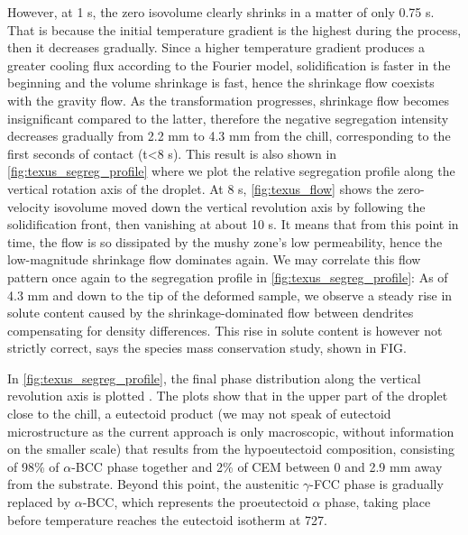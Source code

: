 However, at 1 s, the zero isovolume clearly shrinks in a matter of only 0.75 s. That is
because the initial temperature gradient is the highest during the process, then it decreases gradually. 
Since a higher temperature gradient produces a greater cooling flux according to the Fourier model, solidification is faster
in the beginning and the volume shrinkage is fast, hence the shrinkage flow coexists with the gravity flow. As the transformation
progresses, shrinkage flow becomes insignificant compared to the latter, therefore the negative segregation intensity decreases gradually from 2.2 mm
to 4.3 mm from the chill, corresponding to the first seconds of contact (t<8 s).
This result is also shown in \cref{fig:texus_segreg_profile} where we plot the relative segregation profile along the vertical rotation axis of the droplet.
At 8 s, \cref{fig:texus_flow} shows the zero-velocity isovolume moved down the vertical revolution axis by following
the solidification front, then vanishing at about 10 s. It means that from this point in time, the flow is so dissipated by the mushy zone's low permeability,
hence the low-magnitude shrinkage flow dominates again.
We may correlate this flow pattern once again to the segregation profile in \cref{fig:texus_segreg_profile}:
As of 4.3 mm and down to the tip of the deformed sample, we observe a steady rise in solute content caused 
by the shrinkage-dominated flow between dendrites compensating for density differences. 
This rise in solute content is however not strictly correct, says the species mass conservation study, shown in FIG.

In \cref{fig:texus_segreg_profile}, the final phase distribution along the vertical revolution axis is plotted .
The plots show that in the upper part of the droplet close to the chill, a eutectoid product (we may not speak of eutectoid microstructure as the current approach is only macroscopic, without
information on the smaller scale) that results from the hypoeutectoid composition, consisting of 98\% of $\alpha$-BCC phase together and 2\% of CEM between 0 and 2.9 mm away from the substrate.
Beyond this point, the austenitic $\gamma$-FCC phase is gradually replaced by $\alpha$-BCC, which represents the proeutectoid $\alpha$ phase, taking place before temperature
reaches the eutectoid isotherm at \SI{727}{\udegC}.

